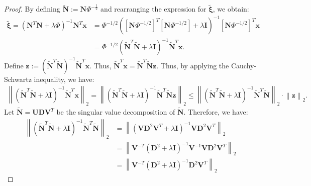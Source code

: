 \documentclass{article}
\newcommand{\norm}[1]{\left\lVert#1\right\rVert}
\begin{document}
\begin{proof}
    By defining $\widetilde{\mathbf{N}} := \mathbf{N}\Phi^{-\frac{1}{2}}$ and rearranging the expression for $\boldsymbol{\widetilde{\xi}}$, we obtain:
    \begin{align}\label{eq:ridge_w_1}
    \boldsymbol{\widetilde{\xi}} = \left(\mathbf{N}^T \mathbf{N}+\lambda \Phi\right)^{-1} \mathbf{N}^T \mathbf{x} &= \Phi^{-1 / 2}\left(\left[\mathbf{N} \Phi^{-1 / 2}\right]^T\left[\mathbf{N} \Phi^{-1 / 2}\right]+\lambda \mathbf{I}\right)^{-1}\left[\mathbf{N} \Phi^{-1 / 2}\right]^T \mathbf{x} \nonumber \\ &=\Phi^{-1 / 2}\left(\widetilde{\mathbf{N}}^T \widetilde{\mathbf{N}}+\lambda \mathbf{I}\right)^{-1} \widetilde{\mathbf{N}}^T \mathbf{x}.
    \end{align}
    Define $\mathbf{z}:=\left(\widetilde{\mathbf{N}}^T \widetilde{\mathbf{N}}\right)^{-1} \widetilde{\mathbf{N}}^T \mathbf{x}$. Thus, $\widetilde{\mathbf{N}}^T \mathbf{x} = \widetilde{\mathbf{N}}^T \widetilde{\mathbf{N}}\mathbf{z}$.
Thus, by applying the Cauchy-Schwartz inequality, we have:
\begin{align}\label{eq:ridge_w_2}
    \norm{\left(\widetilde{\mathbf{N}}^T \widetilde{\mathbf{N}}+\lambda \mathbf{I}\right)^{-1}\widetilde{\mathbf{N}}^T \mathbf{x}}_2 =
    \norm{\left(\widetilde{\mathbf{N}}^T \widetilde{\mathbf{N}}+\lambda \mathbf{I}\right)^{-1}\widetilde{\mathbf{N}}^T \widetilde{\mathbf{N}}\mathbf{z}}_2 \leqslant \norm{\left(\widetilde{\mathbf{N}}^T \widetilde{\mathbf{N}}+\lambda \mathbf{I}\right)^{-1}\widetilde{\mathbf{N}}^T \widetilde{\mathbf{N}}}_2 \cdot \norm{\mathbf{z}}_2.
\end{align}
Let $\widetilde{\mathbf{N}} = \mathbf{UDV}^T$ be the singular value decomposition of $\widetilde{\mathbf{N}}$. Therefore, we have:
\begin{align}
    \norm{\left(\widetilde{\mathbf{N}}^T \widetilde{\mathbf{N}}+\lambda \mathbf{I}\right)^{-1} \widetilde{\mathbf{N}}^T \widetilde{\mathbf{N}}}_2 & =\norm{\left(\mathbf{V} \mathbf{D}^2 \mathbf{V}^T+\lambda \mathbf{I}\right)^{-1} \mathbf{V} \mathbf{D}^2 \mathbf{V}^T}_2 \nonumber \\ &= \norm{\mathbf{V}^{-T}\left(\mathbf{D}^2+\lambda \mathbf{I}\right)^{-1} \mathbf{V}^{-1} \mathbf{V} \mathbf{D}^2 \mathbf{V}^T}_2 \nonumber \\ &= \norm{\mathbf{V}^{-T}\left(\mathbf{D}^2+\lambda \mathbf{I}\right)^{-1} \mathbf{D}^2 \mathbf{V}^T}_2 

\end{align}
\end{proof}
\end{document}
